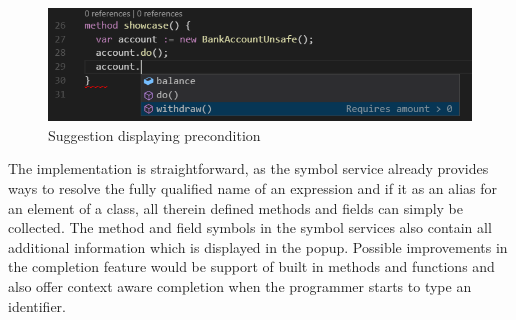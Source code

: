  \begin{figure}[H]
	\centering
	\includegraphics[width=1\textwidth]{img/codeCompletionMethod}
	\caption{Suggestion displaying precondition}
	\label{fig:codecompletionmethod}
\end{figure}

The implementation is straightforward, as the symbol service already provides ways to resolve the fully qualified name of an expression and if it as an alias for an element of a class, all therein defined methods and fields can simply be collected. The method and field symbols in the symbol services also contain all additional information which is displayed in the popup. Possible improvements in the completion feature would be support of built in methods and functions and also offer context aware completion when the programmer starts to type an identifier. 

